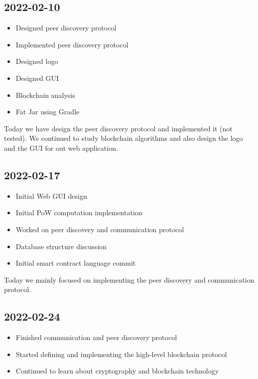 \documentclass{article}
\begin{document}
\subsection*{2022-02-10}

\begin{itemize}
    \item Designed peer discovery protocol
    \item Implemented peer discovery protocol
    \item Designed logo
    \item Designed GUI
    \item Blockchain analysis
    \item Fat Jar using Gradle
\end{itemize}

Today we have design the peer discovery protocol and implemented it (not tested).
We continued to study blockchain algorithms and also design the logo and the GUI for out web application.

\subsection*{2022-02-17}

\begin{itemize}
    \item Initial Web GUI design
    \item Initial PoW computation implementation
    \item Worked on peer discovery and communication protocol
    \item Database structure discussion
    \item Initial smart contract language commit
\end{itemize}

Today we mainly focused on implementing the peer discovery and communication
protocol.

\subsection*{2022-02-24}

\begin{itemize}
    \item Finished communication and peer discovery protocol
    \item Started defining and implementing the high-level blockchain protocol
    \item Continued to learn about cryptography and blockchain technology
\end{itemize}
\end{document}
